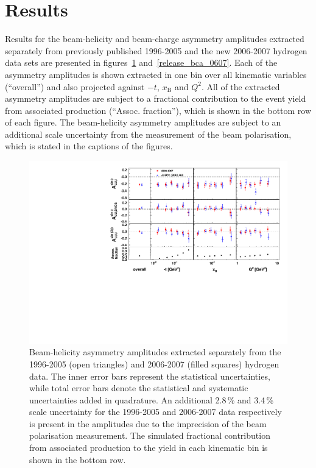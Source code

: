 \section{Results}
Results for the beam-helicity and beam-charge asymmetry amplitudes extracted separately from previously published 1996-2005 and the new 2006-2007 hydrogen data sets are presented in figures~\ref{release_bsa_0607} and~\ref{release_bca_0607}. Each of the asymmetry amplitudes is shown extracted in one bin over all kinematic variables (``overall'') and also projected against $-t$, $x_{\textrm{B}}$ and $Q^{2}$. All of the extracted asymmetry amplitudes are subject to a fractional contribution to the event yield from associated production (``Assoc. fraction''), which is shown in the bottom row of each figure. The beam-helicity asymmetry amplitudes are subject to an additional scale uncertainty from the measurement of the beam polarisation, which is stated in the captions of the figures.
\begin{figure}
\begin{center}
\includegraphics[width=15cm,keepaspectratio]{bsadvcsplots_eml_par13_bin6_pic_0607_9605_cluster_dual}
  \caption{Beam-helicity asymmetry amplitudes extracted separately from
the 1996-2005 (open triangles) and 2006-2007 (filled squares)
hydrogen data. The inner error bars represent the statistical uncertainties, while total error bars denote the statistical and systematic uncertainties added in quadrature.  
An additional 2.8\,\% and 3.4\,\% scale uncertainty for the 1996-2005 and
2006-2007 data respectively is present in the amplitudes due to the imprecision of
the beam polarisation measurement. The simulated fractional contribution from associated production to the yield in each kinematic bin is shown in the bottom row.}
 \label{release_bsa_0607}
\end{center}
 \end{figure}

